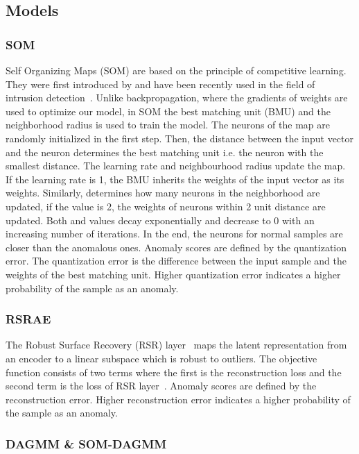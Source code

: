 \documentclass{article}
\begin{document}
\subsection{Models}\label{a3}

\subsubsection{SOM}
 Self Organizing Maps (SOM) are based on the principle of competitive learning. They were first introduced by \citep{kohonen1990self} and have been recently used in the field of intrusion detection~\citep{chen2021multi}. Unlike backpropagation, where the gradients of weights are used to optimize our model, in SOM the best matching unit (BMU) and the neighborhood radius is used to train the model. The neurons of the map are randomly initialized in the first step. Then, the distance between the input vector and the neuron determines the best matching unit i.e. the neuron with the smallest distance. The learning rate  and neighbourhood radius  update the map. If the learning rate is 1, the BMU inherits the weights of the input vector as its weights. Similarly,  determines how many neurons in the neighborhood are updated, if the value is 2, the weights of neurons within 2 unit distance are updated. Both  and  values decay exponentially and decrease to 0 with an increasing number of iterations. In the end, the neurons for normal samples are closer than the anomalous ones. Anomaly scores are defined by the quantization error. The quantization error is the difference between the input sample and the weights of the best matching unit. Higher quantization error indicates a higher probability of the sample as an anomaly.

\subsubsection{RSRAE}

The Robust Surface Recovery (RSR) layer~\citep{rsrae} maps the latent representation from an encoder to a linear subspace which is robust to outliers. The objective function consists of two terms where the first is the reconstruction loss and the second term is the loss of RSR layer~\citep{lerman2019}. Anomaly scores are defined by the reconstruction error. Higher reconstruction error indicates a higher probability of the sample as an anomaly.

\subsubsection{DAGMM \& SOM-DAGMM}
\end{document}
